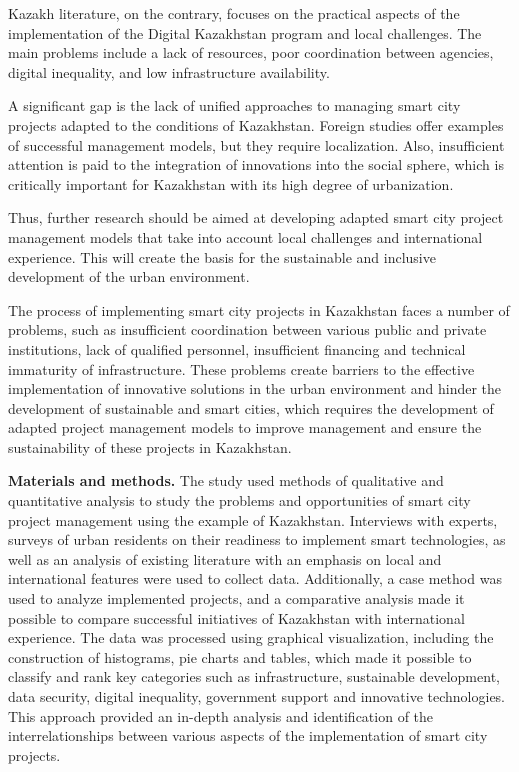 Kazakh literature, on the contrary, focuses on the practical aspects of
the implementation of the Digital Kazakhstan program and local
challenges. The main problems include a lack of resources, poor
coordination between agencies, digital inequality, and low
infrastructure availability.

A significant gap is the lack of unified approaches to managing smart
city projects adapted to the conditions of Kazakhstan. Foreign studies
offer examples of successful management models, but they require
localization. Also, insufficient attention is paid to the integration of
innovations into the social sphere, which is critically important for
Kazakhstan with its high degree of urbanization.

Thus, further research should be aimed at developing adapted smart city
project management models that take into account local challenges and
international experience. This will create the basis for the sustainable
and inclusive development of the urban environment.

The process of implementing smart city projects in Kazakhstan faces a
number of problems, such as insufficient coordination between various
public and private institutions, lack of qualified personnel,
insufficient financing and technical immaturity of infrastructure. These
problems create barriers to the effective implementation of innovative
solutions in the urban environment and hinder the development of
sustainable and smart cities, which requires the development of adapted
project management models to improve management and ensure the
sustainability of these projects in Kazakhstan.

{\bfseries Materials and methods.} The study used methods of qualitative
and quantitative analysis to study the problems and opportunities of
smart city project management using the example of Kazakhstan.
Interviews with experts, surveys of urban residents on their readiness
to implement smart technologies, as well as an analysis of existing
literature with an emphasis on local and international features were
used to collect data. Additionally, a case method was used to analyze
implemented projects, and a comparative analysis made it possible to
compare successful initiatives of Kazakhstan with international
experience. The data was processed using graphical visualization,
including the construction of histograms, pie charts and tables, which
made it possible to classify and rank key categories such as
infrastructure, sustainable development, data security, digital
inequality, government support and innovative technologies. This
approach provided an in-depth analysis and identification of the
interrelationships between various aspects of the implementation of
smart city projects.

